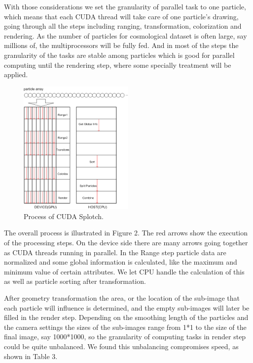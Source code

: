 With those considerations we set the granularity of parallel task to one particle, which 
means that each CUDA thread will take care of one particle's drawing, 
going through all the steps including ranging, transformation, colorization and 
rendering. As the number of particles for cosmological dataset is often large, 
say millions of, the multiprocessors will be fully fed. And in most of the steps the 
granularity of the tasks are stable among particles which is good for
parallel computing until the rendering step, where some specially treatment will be applied.


\begin{figure}
\begin{center}
\includegraphics[width=0.50\textwidth]{cu_splotch_process.png}
\end{center}
\caption{Process of CUDA Splotch.}
\end{figure}

The overall process is illustrated in Figure 2. The red arrows show the 
execution of the processing steps. On the device side there are 
many arrows going together as CUDA threads running in parallel. In the
 Range step particle data are normalized and some global information is calculated, 
 like the maximum and minimum value of certain attributes. We let CPU handle
  the calculation of this as well as particle sorting after transformation.

After geometry transformation the area, or the location of the sub-image that each 
particle will influence is determined, and the empty sub-images will later be filled 
in the render step. Depending on the smoothing length of the particles and the 
camera settings the sizes of the sub-images range from 1*1 to the size of the 
final image, say 1000*1000, so the granularity of computing tasks in render step 
could be quite unbalanced. We found this unbalancing compromises speed, as shown in Table 3.

